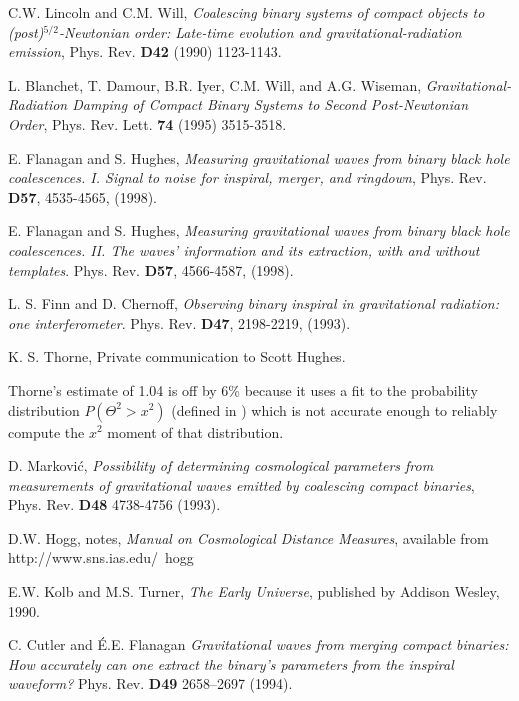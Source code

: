 \documentclass[11pt]{article}
\begin{document}
\begin{thebibliography}{99}
C.W. Lincoln and C.M. Will, {\it Coalescing binary systems of compact
objects to (post)$^{5/2}$-Newtonian order: Late-time evolution and
gravitational-radiation emission}, Phys. Rev. {\bf D42} (1990) 1123-1143.

L. Blanchet, T. Damour, B.R. Iyer, C.M. Will, and A.G. Wiseman,
{\it Gravitational-Radiation Damping of Compact Binary Systems
to Second Post-Newtonian Order},
Phys. Rev. Lett. {\bf 74} (1995) 3515-3518.

E. Flanagan and S. Hughes, {\it Measuring gravitational waves from binary
black hole coalescences.  I. Signal to noise for inspiral, merger,
and ringdown}, Phys. Rev. {\bf D57}, 4535-4565, (1998).

E. Flanagan and S. Hughes, {\it Measuring gravitational waves from binary
black hole coalescences.  II. The waves' information and its extraction,
with and without templates}. Phys. Rev. {\bf D57}, 4566-4587, (1998).

L. S. Finn and D. Chernoff,  {\it Observing binary inspiral in gravitational
radiation: one interferometer}. Phys. Rev. {\bf D47}, 2198-2219, (1993).

K. S. Thorne, Private communication to Scott Hughes.

Thorne's estimate of 1.04 is off by 6\% because it uses a fit to the
probability distribution $P(\Theta^2 > x^2)$ (defined in
{\cite{finnandchernoff}}) which is not accurate enough to reliably
compute the $x^2$ moment of that distribution.

D. Markovi\'c, {\it Possibility of determining cosmological parameters
from measurements of gravitational waves emitted by coalescing compact
binaries}, Phys. Rev. {\bf D48} 4738-4756 (1993).

D.W. Hogg, notes, {\it Manual on Cosmological Distance Measures},
available from
{http://www.sns.ias.edu/~hogg}

E.W. Kolb and M.S. Turner,  {\it The Early Universe},
published by Addison Wesley, 1990.

C. Cutler and {\'E}.E. Flanagan \emph{Gravitational waves from
  merging compact binaries: How accurately can one extract the binary's
  parameters from the inspiral waveform?} Phys. Rev. \textbf{D49}
  2658--2697 (1994).


\end{thebibliography}
\end{document}

